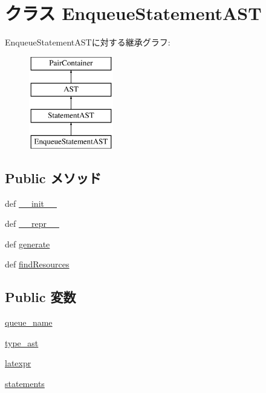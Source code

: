 \hypertarget{classslicc_1_1ast_1_1EnqueueStatementAST_1_1EnqueueStatementAST}{
\section{クラス EnqueueStatementAST}
\label{classslicc_1_1ast_1_1EnqueueStatementAST_1_1EnqueueStatementAST}
}
EnqueueStatementASTに対する継承グラフ:\begin{figure}[H]
\begin{center}
\leavevmode
\includegraphics[height=4cm]{classslicc_1_1ast_1_1EnqueueStatementAST_1_1EnqueueStatementAST}
\end{center}
\end{figure}
\subsection*{Public メソッド}
\begin{DoxyCompactItemize}
\item 
def \hyperlink{classslicc_1_1ast_1_1EnqueueStatementAST_1_1EnqueueStatementAST_ac775ee34451fdfa742b318538164070e}{\_\-\_\-init\_\-\_\-}
\item 
def \hyperlink{classslicc_1_1ast_1_1EnqueueStatementAST_1_1EnqueueStatementAST_ad8b9328939df072e4740cd9a63189744}{\_\-\_\-repr\_\-\_\-}
\item 
def \hyperlink{classslicc_1_1ast_1_1EnqueueStatementAST_1_1EnqueueStatementAST_a4555d1cee0dccf3942ea35fe86de2e8e}{generate}
\item 
def \hyperlink{classslicc_1_1ast_1_1EnqueueStatementAST_1_1EnqueueStatementAST_abd195c795639b490ba2de4c1246105f1}{findResources}
\end{DoxyCompactItemize}
\subsection*{Public 変数}
\begin{DoxyCompactItemize}
\item 
\hyperlink{classslicc_1_1ast_1_1EnqueueStatementAST_1_1EnqueueStatementAST_a733067e60f05a4e8a925c8e36fe46132}{queue\_\-name}
\item 
\hyperlink{classslicc_1_1ast_1_1EnqueueStatementAST_1_1EnqueueStatementAST_a2c41e611550596541faa6f64ffecc139}{type\_\-ast}
\item 
\hyperlink{classslicc_1_1ast_1_1EnqueueStatementAST_1_1EnqueueStatementAST_a5832756c5c802550eedc49a3040fa4e4}{latexpr}
\item 
\hyperlink{classslicc_1_1ast_1_1EnqueueStatementAST_1_1EnqueueStatementAST_aa25d5649a404c698dcacaa271a285c92}{statements}
\end{DoxyCompactItemize}


